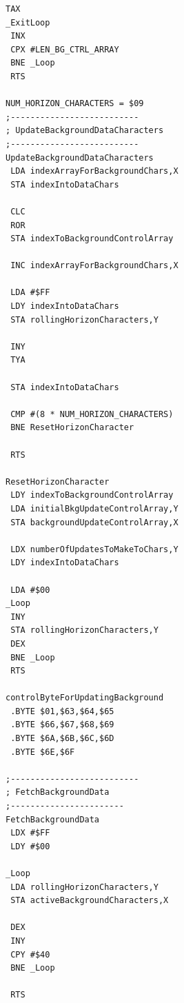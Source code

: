 \begin{minipage}[b]{0.33\linewidth}
\begin{lrbox}{\mybox}%
\begin{lstlisting}[basicstyle=\ttfamily\tiny,escapechar=\%]
 TAX 
_ExitLoop
 INX 
 CPX #LEN_BG_CTRL_ARRAY
 BNE _Loop
 RTS 

NUM_HORIZON_CHARACTERS = $09
;--------------------------
; UpdateBackgroundDataCharacters
;--------------------------
UpdateBackgroundDataCharacters   
 LDA indexArrayForBackgroundChars,X
 STA indexIntoDataChars

 CLC 
 ROR 
 STA indexToBackgroundControlArray

 INC indexArrayForBackgroundChars,X

 LDA #$FF
 LDY indexIntoDataChars
 STA rollingHorizonCharacters,Y

 INY 
 TYA 

 STA indexIntoDataChars

 CMP #(8 * NUM_HORIZON_CHARACTERS)
 BNE ResetHorizonCharacter

 RTS 

ResetHorizonCharacter   
 LDY indexToBackgroundControlArray
 LDA initialBkgUpdateControlArray,Y
 STA backgroundUpdateControlArray,X

 LDX numberOfUpdatesToMakeToChars,Y
 LDY indexIntoDataChars

 LDA #$00
_Loop
 INY 
 STA rollingHorizonCharacters,Y
 DEX 
 BNE _Loop
 RTS 

controlByteForUpdatingBackground   
 .BYTE $01,$63,$64,$65
 .BYTE $66,$67,$68,$69
 .BYTE $6A,$6B,$6C,$6D
 .BYTE $6E,$6F

;--------------------------
; FetchBackgroundData
;-----------------------
FetchBackgroundData   
 LDX #$FF
 LDY #$00

_Loop   
 LDA rollingHorizonCharacters,Y
 STA activeBackgroundCharacters,X

 DEX 
 INY 
 CPY #$40
 BNE _Loop

 RTS 
\end{lstlisting}
\end{lrbox}%
\scalebox{0.8}{\usebox{\mybox}}
\end{minipage}
